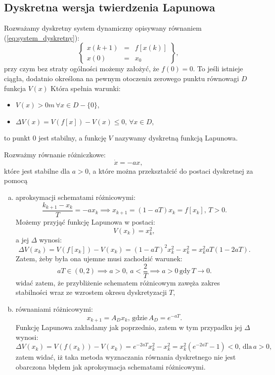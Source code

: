 \documentclass{article}
\begin{document}
    \subsection{Dyskretna wersja twierdzenia Lapunowa}
    Rozważamy dyskretny system dynamiczny opisywany równaniem (\ref{eq:system_dyskretny}):
    \begin{equation}
        \label{eq:system_dyskretny}
        \left\{
        \begin{array}{rcl}
            x(k+1)  &   =   &   f[x(k)]\\
            x(0)    &   =   & x_{0}
        \end{array}
        \right\},
    \end{equation}
    przy czym bez straty ogólności możemy założyć, że $f(0) = 0$.
    To jeśli istnieje ciągła, dodatnio określona na pewnym otoczeniu zerowego punktu równowagi $D$ funkcja $V(x)$
    Która spełnia warunki:
    \begin{itemize}
        \item $V(x) > 0m\, \forall x \in D - \{0\}$,
        \item $\Delta V(x) = V(f[x]) - V(x) \leq 0, \, \forall x\in D$,
    \end{itemize}
    to punkt $0$ jest stabilny, a funkcję $V$ nazywamy dyskretną funkcją Lapunowa.

    \begin{tcolorbox}[colback=green!5, colframe=green!75!black, title=Przykład]
    Rozważmy równanie różniczkowe:
    $$
        \dot{x} = -ax,
    $$
    które jest stabilne dla $a>0$, a które można przekształcić do postaci dyskretnej za pomocą
    \begin{enumerate}[(a)]
        \item aproksymacji schematami różnicowymi:
        $$
            \frac{k_{k+1}-x_{k}}{T} = -ax_{k} \implies x_{k+1} = (1-aT)x_{k} = f[x_{k}], \, T>0.
        $$
        Możemy przyjąć funkcję Lapunowa w postaci:
        $$
            V(x_{k}) = x_{k}^{2},
        $$
        a jej $\Delta$ wynosi:
        $$
            \Delta V(x_{k})
            =
            V(f[x_{k}]) - V(x_{k})
            =
            (1-aT)^{2}x_{k}^{2} - x_{k}^{2}
            =
            x_{k}^{2}aT(1-2aT).
        $$
        Zatem, żeby była ona ujemne musi zachodzić warunek:
        $$
            aT \in (0, 2) \implies a>0,\,a<\frac{2}{T} \implies a>0\,\text{gdy}\,T\rightarrow0.
        $$
        widać zatem, że przybliżenie schematem różnicowym zawęża zakres stabilności wraz ze wzrostem okresu dyskretyzacji $T$,

        \item równaniami różnicowymi:
        $$
            x_{k+1} = A_{D} x_{k},\,\text{gdzie}\,A_{D} = e^{-aT}.
        $$
        Funkcję Lapunowa zakładamy jak poprzednio, zatem w tym przypadku jej $\Delta$ wynosi:
        $$
            \Delta V(x_{k}) = V(f(x_{k})) - V(x_{k}) = e^{-2aT}x_{k}^{2} - x_{k}^{2} = x_{k}^{2}(e^{-2aT} -1) < 0,\,\text{dla}\, a>0,
        $$
        zatem widać, iż taka metoda wyznaczania równania dyskretnego nie jest obarczona błędem jak aproksymacja schematami różnicowymi.
    \end{enumerate}
    \end{tcolorbox}
\end{document}
